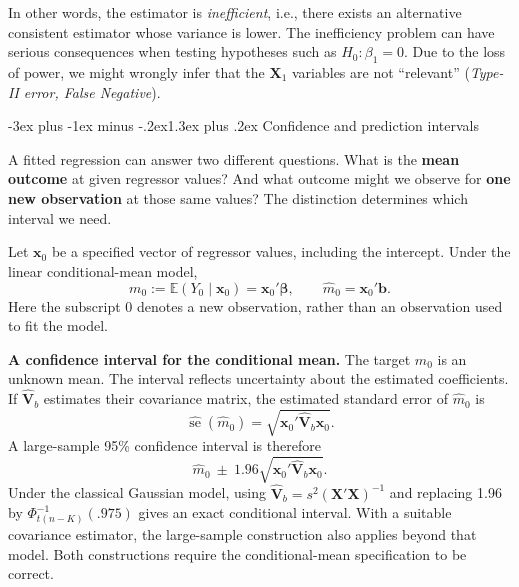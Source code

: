 \documentclass[
  11pt,
]{book}
\makeatletter
\renewcommand\section{\@startsection{section}{1}{\z@}
  {-3ex plus -1ex minus -.2ex}{1.3ex plus .2ex}
  {\normalfont\Large\bfseries\color{TextbookInk}}}
\theoremstyle{definition}
\theoremstyle{definition}
\theoremstyle{definition}
\theoremstyle{definition}
\theoremstyle{remark}
\makeatother
\begin{document}
In other words, the estimator is \emph{inefficient}, i.e., there exists an alternative consistent estimator whose variance is lower. The inefficiency problem can have serious consequences when testing hypotheses such as \(H_0: \beta_1 = 0\). Due to the loss of power, we might wrongly infer that the \(\mathbf{X}_1\) variables are not ``relevant'' (\emph{Type-II error, False Negative}).

\section{Confidence and prediction intervals}\label{regression-prediction-intervals}

A fitted regression can answer two different questions. What is the \textbf{mean outcome} at given regressor values? And what outcome might we observe for \textbf{one new observation} at those same values? The distinction determines which interval we need.

Let \(\mathbf{x}_0\) be a specified vector of regressor values, including the intercept. Under the linear conditional-mean model,
\[
m_0 := \mathbb{E}(Y_0\mid\mathbf{x}_0)=\mathbf{x}_0'\boldsymbol\beta,
\qquad \widehat m_0=\mathbf{x}_0'\mathbf{b}.
\]
Here the subscript 0 denotes a new observation, rather than an observation used to fit the model.

\textbf{A confidence interval for the conditional mean.} The target \(m_0\) is an unknown mean. The interval reflects uncertainty about the estimated coefficients. If \(\widehat{\mathbf{V}}_b\) estimates their covariance matrix, the estimated standard error of \(\widehat m_0\) is
\begin{equation}
\widehat{\operatorname{se}}(\widehat m_0)
=\sqrt{\mathbf{x}_0'\widehat{\mathbf{V}}_b\mathbf{x}_0}.\label{eq:mean-prediction-se}
\end{equation}
A large-sample 95\% confidence interval is therefore
\[
\widehat m_0\ \pm\ 1.96\sqrt{\mathbf{x}_0'\widehat{\mathbf{V}}_b\mathbf{x}_0}.
\]
Under the classical Gaussian model, using \(\widehat{\mathbf{V}}_b=s^2(\mathbf{X}'\mathbf{X})^{-1}\) and replacing 1.96 by \(\Phi^{-1}_{t(n-K)}(.975)\) gives an exact conditional interval. With a suitable covariance estimator, the large-sample construction also applies beyond that model. Both constructions require the conditional-mean specification to be correct.
\end{document}
